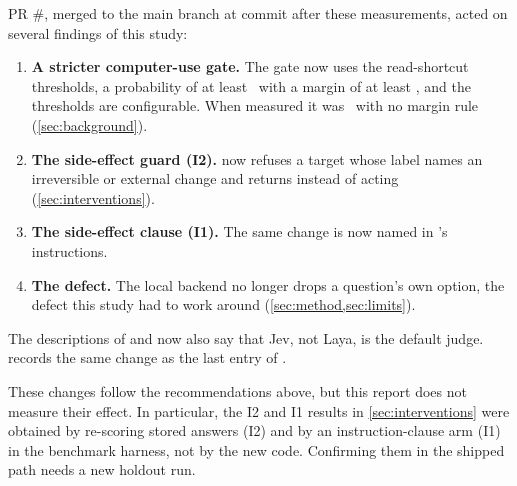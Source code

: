 PR \#\SincePR, merged to the main branch at commit \code{\SinceCommit} after these measurements, acted
on several findings of this study:
\begin{enumerate}[label=(\alph*)]
  \item \textbf{A stricter computer-use gate.} The  gate now uses the read-shortcut
    thresholds, a probability of at least \MinP\ with a margin of at least \MinMargin, and the thresholds
    are configurable. When measured it was \CuaMinP\ with no margin rule (\cref{sec:background}).
  \item \textbf{The side-effect guard (I2).}  now refuses a target whose label names an
    irreversible or external change and returns  instead of
    acting (\cref{sec:interventions}).
  \item \textbf{The side-effect clause (I1).} The same change is now named in 's
    instructions.
  \item \textbf{The  defect.} The local backend no longer drops a question's own
     option, the defect this study had to work around (\cref{sec:method,sec:limits}).
\end{enumerate}
The descriptions of  and  now also say that Jev, not Laya, is the default
judge.  records the same change as the last entry of .

These changes follow the recommendations above, but this report does not measure their effect. In
particular, the I2 and I1 results in \cref{sec:interventions} were obtained by re-scoring stored answers
(I2) and by an instruction-clause arm (I1) in the benchmark harness, not by the new  code.
Confirming them in the shipped path needs a new holdout run.
